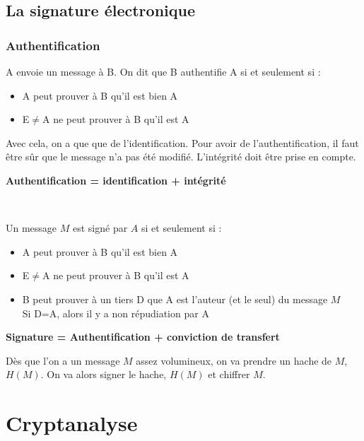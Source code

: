 \subsection{La signature électronique}
\subsubsection{Authentification}
A envoie un message à B. On dit que B authentifie A si et seulement si :
\begin{itemize}
 \item A peut prouver à B qu'il est bien A
 \item E$\neq$A ne peut prouver à B qu'il est A
\end{itemize}
Avec cela, on a que que de l'identification. Pour avoir de l'authentification, il faut être sûr que le message n'a pas été modifié. L'intégrité doit être prise en compte.\\
\begin{center}
 \textbf{Authentification = identification + intégrité}
\end{center}
~\\\par
Un message $M$ est signé par $A$ si et seulement si :
\begin{itemize}
 \item A peut prouver à B qu'il est bien A
 \item E$\neq$A ne peut prouver à B qu'il est A
 \item B peut prouver à un tiers D que A est l'auteur (et le seul) du message $M$\\Si D=A, alors il y a non répudiation par A
\end{itemize}
\begin{center}
 \textbf{Signature = Authentification + conviction de transfert}
\end{center}
Dès que l'on a un message $M$ assez volumineux, on va prendre un hache de $M$, $H(M)$. On va alors signer le hache, $H(M)$ et chiffrer $M$.
\section{Cryptanalyse}
